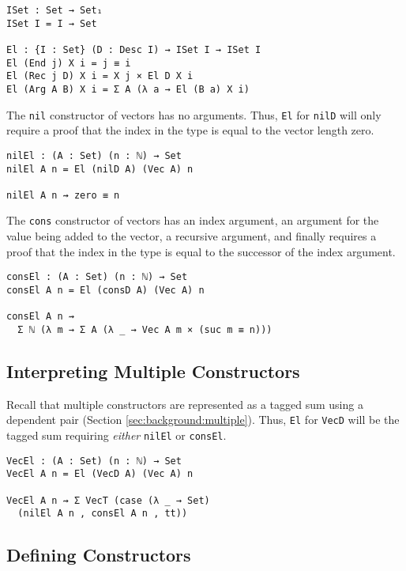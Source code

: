 \documentclass[preprint,nonatbib]{sigplanconf}
\newcommand{\refsec}[1]{Section \ref{sec:#1}}
\begin{document}
\begin{verbatim}
ISet : Set → Set₁
ISet I = I → Set

El : {I : Set} (D : Desc I) → ISet I → ISet I
El (End j) X i = j ≡ i
El (Rec j D) X i = X j × El D X i
El (Arg A B) X i = Σ A (λ a → El (B a) X i)
\end{verbatim}

The {\tt nil} constructor of vectors has no arguments. Thus,
{\tt El} for {\tt nilD} will only require a proof that the index in
the type is equal to the vector length zero.

\begin{verbatim}
nilEl : (A : Set) (n : ℕ) → Set
nilEl A n = El (nilD A) (Vec A) n

nilEl A n ⇝ zero ≡ n
\end{verbatim}

The {\tt cons} constructor of vectors has an index argument, an
argument for the value being added to the vector, a recursive
argument, and finally requires a proof that the index in the type is
equal to the successor of the index argument.

\begin{verbatim}
consEl : (A : Set) (n : ℕ) → Set
consEl A n = El (consD A) (Vec A) n

consEl A n ⇝
  Σ ℕ (λ m → Σ A (λ _ → Vec A m × (suc m ≡ n)))
\end{verbatim}

\subsection{Interpreting Multiple Constructors}

Recall that multiple constructors are represented as a tagged sum
using a dependent pair (\refsec{background:multiple}). Thus,
{\tt El} for {\tt VecD} will be the tagged sum requiring
{\it either} {\tt nilEl} or {\tt consEl}.

\begin{verbatim}
VecEl : (A : Set) (n : ℕ) → Set
VecEl A n = El (VecD A) (Vec A) n

VecEl A n ⇝ Σ VecT (case (λ _ → Set)
  (nilEl A n , consEl A n , tt))
\end{verbatim}

\subsection{Defining Constructors}
\label{sec:init:cons}
\end{document}
